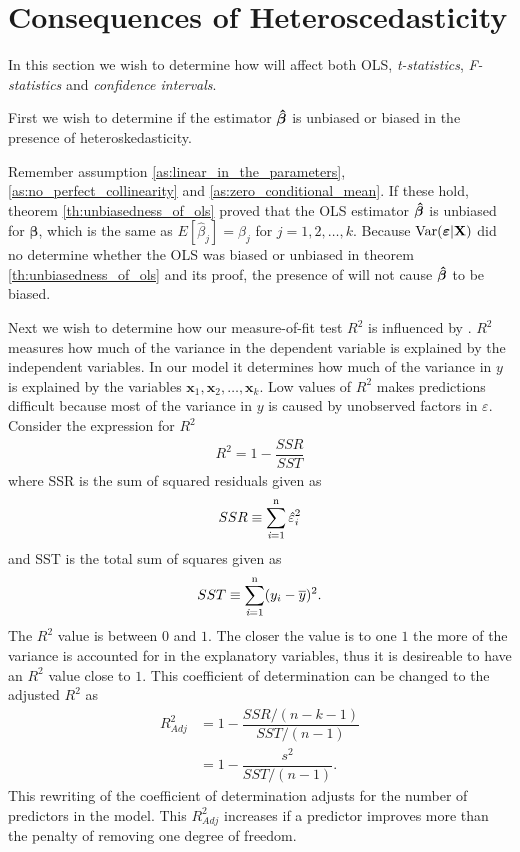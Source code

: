 \newpage
\section{Consequences of Heteroscedasticity}\label{sec:consequence_of_hetero}
In this section we wish to determine how \hetero will affect both OLS, \textit{t-statistics}, \textit{F-statistics} and \textit{confidence intervals}. 

First we wish to determine if the estimator $\operatorname{\boldsymbol{\hat{\beta}}}$ is unbiased or biased in the presence of heteroskedasticity.  

Remember assumption \ref{as:linear_in_the_parameters}, \ref{as:no_perfect_collinearity} and \ref{as:zero_conditional_mean}. If these hold, theorem \ref{th:unbiasedness_of_ols} proved that the OLS estimator $\operatorname{\boldsymbol{\hat{\beta}}}$ is unbiased for $\boldsymbol{\beta}$, which is the same as $E[\hat{\beta}_j] = \beta_j
$ for $j = 1,2, \ldots, k$. 
Because $\operatorname{\text{Var}}(\boldsymbol{\varepsilon} | \mathbf{X})$ did no determine whether the OLS was biased or unbiased in theorem \ref{th:unbiasedness_of_ols} and its proof, the presence of \hetero will not cause $\operatorname{\boldsymbol{\hat{\beta}}}$ to be biased. 

Next we wish to determine how our measure-of-fit test $R^2$ is influenced by \hetero. 
$R^2$ measures how much of the variance in the dependent variable is explained by the independent variables. In our model it determines how much of the variance in $y$ is explained by the variables $\mathbf{x}_1, \mathbf{x}_2, \ldots, \mathbf{x}_k$. 
Low values of $R^2$ makes predictions difficult because most of the variance in $y$ is caused by unobserved factors in $\varepsilon$.
Consider the expression for $R^2$
\begin{align*}
    R^2 = 1 - \dfrac{SSR}{SST}
\end{align*}
where SSR is the sum of squared residuals given as
\begin{align*}
    SSR \equiv \operatorname{\sum_{\textit{i}=1}^n} \hat{\varepsilon}_i^2
\end{align*}
and SST is the total sum of squares given as
\begin{align*}
    SST \equiv \operatorname{\sum_{\textit{i}=1}^n} (y_i - \overline{y})^2. 
\end{align*}
The $R^2$ value is between $0$ and $1$. The closer the value is to one $1$ the more of the variance is accounted for in the explanatory variables, thus it is desireable to have an $R^2$ value close to $1$.
This coefficient of determination can be changed to the adjusted $R^2$ as
\begin{align*}
    R^2_{Adj} &= 1 - \dfrac{SSR/(n - k - 1)}{SST/(n - 1)}\\
      &= 1 - \dfrac{s^2}{SST/(n-1)}.
\end{align*}
This rewriting of the coefficient of determination adjusts for the number of predictors in the model. This $R^2_{Adj}$ increases if a predictor improves more than the penalty of removing one degree of freedom. 

